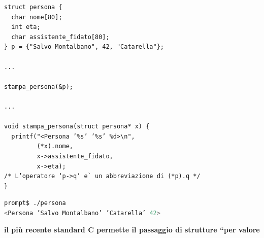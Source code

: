 \documentclass[a4paper,12pt, oneside]{book}
\begin{document}
\begin{verbatim}
struct persona {
  char nome[80];
  int eta;
  char assistente_fidato[80];
} p = {"Salvo Montalbano", 42, "Catarella"};

...

stampa_persona(&p);

...

void stampa_persona(struct persona* x) {
  printf("<Persona ’%s’ ’%s’ %d>\n",
         (*x).nome,
         x->assistente_fidato,
         x->eta);
/* L’operatore ‘p->q’ e` un abbreviazione di (*p).q */
}
\end{verbatim}
\begin{shaded}
\begin{lstlisting}[language=bash]
prompt$ ./persona
<Persona ’Salvo Montalbano’ ’Catarella’ 42>
\end{lstlisting}
\end{shaded}
\textbf{il più recente standard C permette il passaggio di strutture
“per valore}
\end{document}
